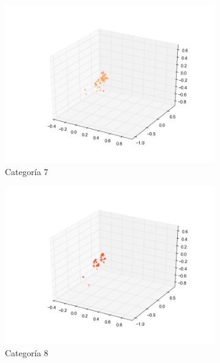 \begin{figure}[H]
\begin{subfigure}[b]{0.33\textwidth}
                \includegraphics[width=\linewidth]{secciones/graficos/sanger/categoria_7.png}
                \caption{Categoría 7}
                \label{fig: ej1_sanger_categoria_7}
        \end{subfigure}
        \begin{subfigure}[b]{0.33\textwidth}
                \includegraphics[width=\linewidth]{secciones/graficos/sanger/categoria_8.png}
                \caption{Categoría 8}
                \label{fig: ej1_sanger_categoria_8}
        \end{subfigure}
        \begin{subfigure}[b]{0.33\textwidth}

\end{subfigure}
\end{figure}
